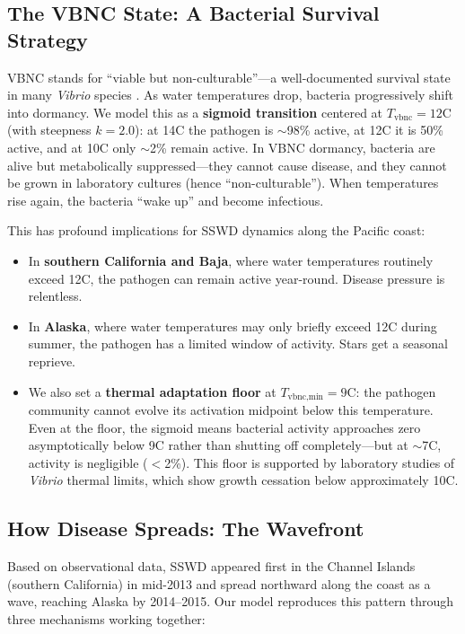\documentclass[11pt]{article}
\begin{document}
\subsection*{The VBNC State: A Bacterial Survival Strategy}

VBNC stands for ``viable but non-culturable''---a well-documented survival state in many \textit{Vibrio} species \citep{liu2019}. As water temperatures drop, bacteria progressively shift into dormancy. We model this as a \textbf{sigmoid transition} centered at $T_{\text{vbnc}} = 12$\textdegree C (with steepness $k = 2.0$): at 14\textdegree C the pathogen is $\sim$98\% active, at 12\textdegree C it is 50\% active, and at 10\textdegree C only $\sim$2\% remain active. In VBNC dormancy, bacteria are alive but metabolically suppressed---they cannot cause disease, and they cannot be grown in laboratory cultures (hence ``non-culturable''). When temperatures rise again, the bacteria ``wake up'' and become infectious.

This has profound implications for SSWD dynamics along the Pacific coast:
\begin{itemize}[leftmargin=2em]
    \item In \textbf{southern California and Baja}, where water temperatures routinely exceed 12\textdegree C, the pathogen can remain active year-round. Disease pressure is relentless.
    \item In \textbf{Alaska}, where water temperatures may only briefly exceed 12\textdegree C during summer, the pathogen has a limited window of activity. Stars get a seasonal reprieve.
    \item We also set a \textbf{thermal adaptation floor} at $T_{\text{vbnc,min}} = 9$\textdegree C: the pathogen community cannot evolve its activation midpoint below this temperature. Even at the floor, the sigmoid means bacterial activity approaches zero asymptotically below 9\textdegree C rather than shutting off completely---but at $\sim$7\textdegree C, activity is negligible ($<$2\%). This floor is supported by laboratory studies of \textit{Vibrio} thermal limits, which show growth cessation below approximately 10\textdegree C.
\end{itemize}

\subsection*{How Disease Spreads: The Wavefront}

Based on observational data, SSWD appeared first in the Channel Islands (southern California) in mid-2013 and spread northward along the coast as a wave, reaching Alaska by 2014--2015. Our model reproduces this pattern through three mechanisms working together:
\end{document}

